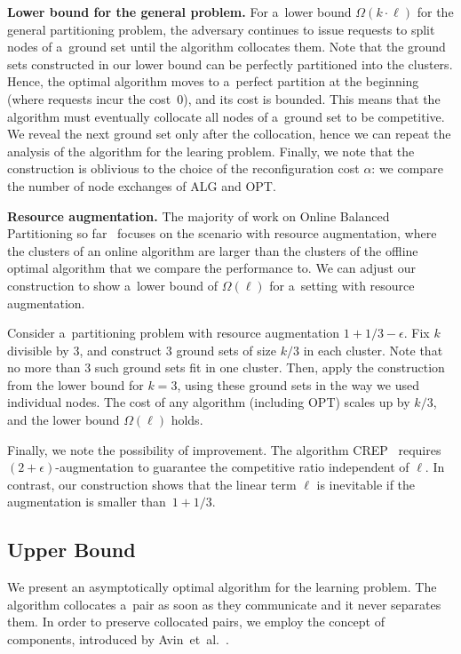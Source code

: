 \documentclass[a4paper,anonymous,USenglish]{lipics-v2019}
\newcommand{\OPT}{\textsc{OPT}\xspace}
\newcommand{\ALG}{\textsc{ALG}\xspace}
\begin{document}
\noindent
\textbf{Lower bound for the general problem.}
For a~lower bound $\Omega(k\cdot \ell)$ for the general partitioning problem, the adversary continues to issue requests to split nodes of a~ground set until the algorithm collocates them.
Note that the ground sets constructed in our lower bound can be perfectly partitioned into the clusters.
Hence, the optimal algorithm moves to a~perfect partition at the beginning (where requests incur the cost~$0$), and its cost is bounded.
This means that the algorithm must eventually collocate all nodes of a~ground set to be competitive.
We reveal the next ground set only after the collocation, hence we can repeat the analysis of the algorithm for the learing problem.
Finally, we note that the construction is oblivious to the choice of the reconfiguration cost $\alpha$: we compare the 	number of node exchanges of \ALG and \OPT.

\medskip

\noindent
\textbf{Resource augmentation.}
The majority of work on Online Balanced Partitioning so far~\cite{repartition-disc,sigmetrics19_partitioning} focuses on the scenario with resource augmentation, where the clusters of an online algorithm are larger than the clusters of the offline optimal algorithm that we compare the performance to.
We can adjust our construction to show a~lower bound of $\Omega(\ell)$ for a~setting with resource augmentation.

Consider a~partitioning problem with resource augmentation $1+1/3-\epsilon$.
Fix $k$ divisible by $3$, and construct $3$ ground sets of size $k/3$ in each cluster.
Note that no more than $3$ such ground sets fit in one cluster.
Then, apply the construction from the lower bound for $k=3$, using these ground sets in the way we used individual nodes.
The cost of any algorithm (including \OPT) scales up by $k/3$, and the lower bound $\Omega(\ell)$ holds.

Finally, we note the possibility of improvement. The algorithm CREP~\cite{repartition-disc} requires $(2+\epsilon)$-augmentation to guarantee the competitive ratio independent of $\ell$.
In contrast, our construction shows that the linear term $\ell$ is inevitable if the augmentation is smaller than~$1+1/3$.

\subsection{Upper Bound}
\label{sec:ppl}

We present an asymptotically optimal algorithm for the learning problem.
The algorithm  collocates  a~pair as soon as they communicate and it never separates them.
In order to preserve collocated pairs,
we employ the concept of components,
introduced by Avin~et~al.~\cite{repartition-disc}.
\end{document}
